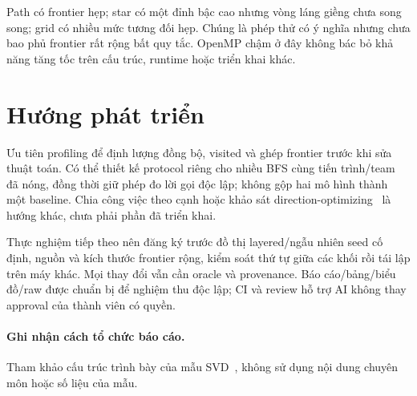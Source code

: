 Path có frontier hẹp; star có một đỉnh bậc cao nhưng vòng láng giềng chưa song song; grid có nhiều mức tương đối hẹp. Chúng là phép thử có ý nghĩa nhưng chưa bao phủ frontier rất rộng bất quy tắc. OpenMP chậm ở đây không bác bỏ khả năng tăng tốc trên cấu trúc, runtime hoặc triển khai khác.

\section{Hướng phát triển}
Ưu tiên profiling để định lượng đồng bộ, visited và ghép frontier trước khi sửa thuật toán. Có thể thiết kế protocol riêng cho nhiều BFS cùng tiến trình/team đã nóng, đồng thời giữ phép đo lời gọi độc lập; không gộp hai mô hình thành một baseline. Chia công việc theo cạnh hoặc khảo sát direction-optimizing~\cite{beamer2012} là hướng khác, chưa phải phần đã triển khai.

Thực nghiệm tiếp theo nên đăng ký trước đồ thị layered/ngẫu nhiên seed cố định, nguồn và kích thước frontier rộng, kiểm soát thứ tự giữa các khối rồi tái lập trên máy khác. Mọi thay đổi vẫn cần oracle và provenance. Báo cáo/bảng/biểu đồ/raw được chuẩn bị để nghiệm thu độc lập; CI và review hỗ trợ AI không thay approval của thành viên có quyền.

\paragraph{Ghi nhận cách tổ chức báo cáo.} Tham khảo cấu trúc trình bày của mẫu SVD~\cite{svdtemplate}, không sử dụng nội dung chuyên môn hoặc số liệu của mẫu.

